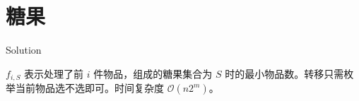 \section{糖果}

\begin{frame}{Solution}

$f_{i,S}$ 表示处理了前 $i$ 件物品，组成的糖果集合为 $S$ 时的最小物品数。转移只需枚举当前物品选不选即可。时间复杂度 $\mathcal O(n2^m)$。
 
\end{frame}